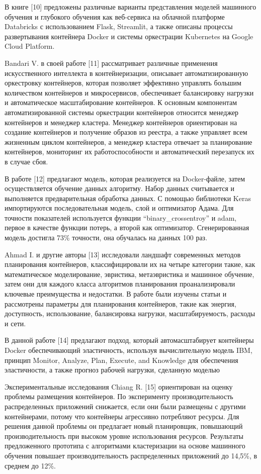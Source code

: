 В книге {[}10{]} предложены различные варианты представления моделей
машинного обучения и глубокого обучения как веб-сервиса на облачной
платформе Databricks с использованием Flask, Streamlit, а также описаны
процессы развертывания контейнера Docker и системы оркестрации
Kubernetes на Google Cloud Platform.

Bandari V. в своей работе {[}11{]} рассматривает различные применения
искусственного интеллекта в контейнеризации, описывает
автоматизированную оркестровку контейнеров, которая позволяет эффективно
управлять большим количеством контейнеров и микросервисов, обеспечивает
балансировку нагрузки и автоматическое масштабирование контейнеров. К
основным компонентам автоматизированной системы оркестрации контейнеров
относится менеджер контейнеров и менеджер кластера. Менеджер контейнеров
ориентирован на создание контейнеров и получение образов из реестра, а
также управляет всем жизненным циклом контейнеров, а менеджер кластера
отвечает за планирование контейнеров, мониторинг их работоспособности и
автоматический перезапуск их в случае сбоя.

В работе {[}12{]} предлагают модель, которая реализуется на
Docker-файле, затем осуществляется обучение данных алгоритму. Набор
данных считывается и выполняется предварительная обработка данных. С
помощью библиотеки Keras импортируются последовательная модель, слой и
оптимизатор Адама. Для точности показателей используется функции
``binary\_crossentroy'' и adam, первое в качестве функции потерь, а
второй как оптимизатор. Сгенерированная модель достигла 73\% точности,
она обучалась на данных 100 раз.

Ahmad I. и другие авторы {[}13{]} исследовали ландшафт современных
методов планирования контейнеров, классифицировали их на четыре
категории такие, как математическое моделирование, эвристика,
метаэвристика и машинное обучение, затем они для каждого класса
алгоритмов планирования проанализировали ключевые преимущества и
недостатки. В работе были изучены статьи и рассмотрены параметры для
планирования контейнеров, такие как энергия, доступность, использование,
балансировка нагрузки, масштабируемость, расходы и сети.

В данной работе {[}14{]} предлагают подход, который автомасштабирует
контейнеры Docker обеспечивающий эластичность, используя вычислительную
модель IBM, принцип Monitor, Analyze, Plan, Execute, and Knowledge для
обеспечения эластичности, а также прогноз рабочей нагрузки, сделанную
моделью

Экспериментальные исследования Chiang R. {[}15{]} ориентирован на оценку
проблемы размещения контейнеров. По эксперименту производительность
распределенных приложений снижается, если они были размещены с другими
контейнерами, потому что контейнеры агрессивно потребляют ресурсы. Для
решения данной проблемы он предлагает новый планировщик, повышающий
производительность при высоком уровне использования ресурсов. Результаты
предложенного прототипа с алгоритмами кластеризации на основе машинного
обучения повышает производительность распределенных приложений до
14,5\%, в среднем до 12\%.

